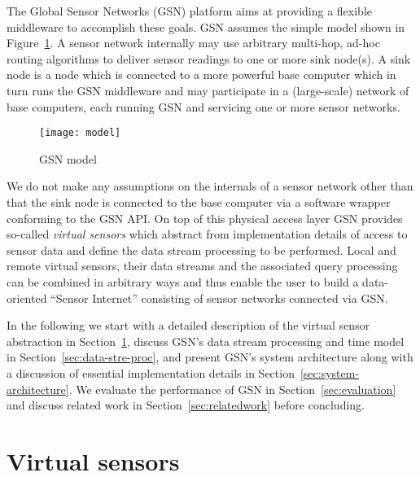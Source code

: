 The Global Sensor Networks (GSN) platform aims at providing a flexible
middleware to accomplish these goals.  GSN assumes the simple model
shown in Figure~\ref{fig:setup}. A sensor network internally may use
arbitrary multi-hop, ad-hoc routing algorithms to deliver sensor
readings to one or more sink node(s). A sink node is a node which is
connected to a more powerful base computer which in turn runs the GSN
middleware and may participate in a (large-scale) network of base
computers, each running GSN and servicing one or more sensor networks.

\begin{figure}
  \centering
  \texttt{[image: model]}
  \caption{GSN model}
  \label{fig:setup}
\end{figure}

We do not make any assumptions on the internals of a sensor network
other than that the sink node is connected to the base computer via a
software wrapper conforming to the GSN API. On top of this physical
access layer GSN provides so-called \textit{virtual sensors} which
abstract from implementation details of access to sensor data and
define the data stream processing to be performed. Local and remote
virtual sensors, their data streams and the associated query
processing can be combined in arbitrary ways and thus enable the user
to build a data-oriented ``Sensor Internet'' consisting of sensor
networks connected via GSN.

In the following we start with a detailed description of the virtual
sensor abstraction in Section~\ref{sec:virt-sens-spec}, discuss GSN's
data stream processing and time model in
Section~\ref{sec:data-stre-proc}, and present GSN's system architecture
along with a discussion of essential implementation details
in Section~\ref{sec:system-architecture}. We
evaluate the performance of GSN in Section~\ref{sec:evaluation} and
discuss related work in Section~\ref{sec:relatedwork} before
concluding.

\section{Virtual sensors}
\label{sec:virt-sens-spec}

